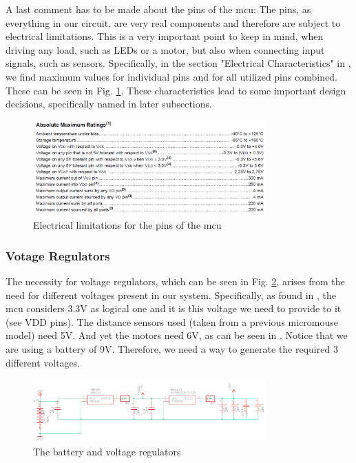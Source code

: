 A last comment has to be made about the pins of the mcu: The pins, as everything in our circuit, are very real components and therefore are subject to electrical limitations. This is a very important point to keep in mind, when driving any load, such as LEDs or a motor, but also when connecting input signals, such as sensors.
Specifically, in the section "Electrical Characteristics" in \cite{mcu}, we find maximum values for individual pins and for all utilized pins combined. These can be seen in Fig. \ref{fig:electrical}. These characteristics lead to some important design decisions, specifically named in later subsections.

\begin{figure}[htb]
    \centering
    \includegraphics[width=0.8\textwidth]{figures/hardware/Electrical.PNG}
    \caption{Electrical limitations for the pins of the mcu}
    \label{fig:electrical}
\end{figure}

\FloatBarrier
\vspace{1cm}

\subsubsection{Votage Regulators}

The necessity for voltage regulators, which can be seen in Fig. \ref{fig:battery}, arises from the need for different voltages present in our system. 
Specifically, as found in \cite{mcu}, the mcu considers 3.3V as logical one and it is this voltage we need to provide to it (see VDD pins). The distance sensors used (taken from a previous micromouse model) need 5V. And yet the motors need 6V, as can be seen in \cite{motor}. 
Notice that we are using a battery of 9V. Therefore, we need a way to generate the required 3 different voltages.

\begin{figure}[htb]
    \centering
    \includegraphics[width=0.8\textwidth]{figures/hardware/VoltageandCapacitors.PNG}
    \caption{The battery and voltage regulators}
    \label{fig:battery}
\end{figure}

